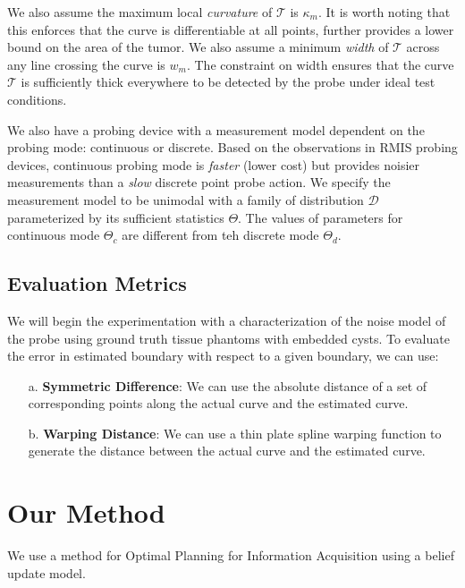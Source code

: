 \documentclass[letterpaper, 10 pt, conference]{ieeeconf}
\begin{document}
We also assume the maximum local \textit{curvature} of $\mathcal{T}$ is $\kappa_m$. It is worth noting that this enforces that the curve is differentiable at all points, further provides a lower bound on the area of the tumor. We also assume a minimum \textit{width} of $\mathcal{T}$ across any line crossing the curve is $w_m$.
The constraint on width ensures that the curve $\mathcal{T}$ is sufficiently thick everywhere to be detected by the probe under ideal test conditions.

We also have a probing device with a measurement model dependent on the probing mode: continuous or discrete. Based on the observations in RMIS probing devices, continuous probing mode is \textit{faster} (lower cost) but provides noisier measurements than a \textit{slow} discrete point probe action. We specify the measurement model to be unimodal with a family of distribution $\mathcal{D}$  parameterized by its sufficient statistics $\Theta$. The values of parameters for continuous mode $\Theta_c$ are different from teh discrete mode $\Theta_d$.


\subsection{Evaluation Metrics}
We will begin the experimentation with a characterization of the noise model of the probe using ground truth tissue phantoms with embedded cysts. To evaluate the error in estimated boundary  with respect to a given boundary, we can use: 
\begin{enumerate}[leftmargin=*]
\item[a.] \textbf{Symmetric Difference}: We can use the absolute distance of a set of corresponding points along the actual curve and the estimated curve. 
\item[b.] \textbf{Warping Distance}: We can use a thin plate spline warping function to generate the distance between the actual curve and the estimated curve. 
\end{enumerate}


\section{Our Method}
\label{sec:approach}
We use a method for Optimal Planning for Information
Acquisition using a belief update model. 
\end{document}
